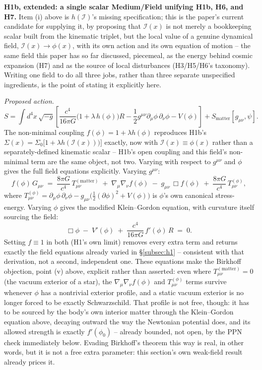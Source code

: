 \documentclass[12pt, a4paper]{article}
\begin{document}
\textbf{H1b, extended: a single scalar Medium/Field unifying H1b, H6,
and H7.} Item (i) above is $h(\mathcal{I})$'s missing specification;
this is the paper's current candidate for supplying it, by proposing
that $\mathcal{I}(x)$ is not merely a bookkeeping scalar built from
the kinematic triplet, but the local value of a genuine dynamical
field, $\mathcal{I}(x)\to\phi(x)$, with its own action and its own
equation of motion -- the same field this paper has so far discussed,
piecemeal, as the energy behind cosmic expansion (H7) and as the
source of local disturbances (H3/H5/H6's taxonomy). Writing one field
to do all three jobs, rather than three separate unspecified
ingredients, is the point of stating it explicitly here.

\emph{Proposed action.}
\begin{equation}
S = \int d^4x\,\sqrt{-g}\left[\frac{c^4}{16\pi G}\big(1+\lambda\,h(\phi)\big)R
    -\frac12 g^{\mu\nu}\partial_\mu\phi\,\partial_\nu\phi - V(\phi)\right]
    + S_{\text{matter}}[g_{\mu\nu},\psi].
\end{equation}
The non-minimal coupling $f(\phi)=1+\lambda h(\phi)$ reproduces H1b's
$\Sigma(x)=\Sigma_0\big[1+\lambda h(\mathcal{I}(x))\big)]$ exactly, now
with $\mathcal{I}(x)\equiv\phi(x)$ rather than a separately-defined
kinematic scalar -- H1b's open coupling and this field's non-minimal
term are the same object, not two. Varying with respect to $g^{\mu\nu}$
and $\phi$ gives the full field equations explicitly. Varying
$g^{\mu\nu}$:
\begin{equation}
f(\phi)\,G_{\mu\nu} \;=\; \frac{8\pi G}{c^4}\,T_{\mu\nu}^{(\text{matter})}
\;+\; \nabla_\mu\nabla_\nu f(\phi) \;-\; g_{\mu\nu}\,\Box f(\phi)
\;+\; \frac{8\pi G}{c^4}\,T_{\mu\nu}^{(\phi)},
\end{equation}
where $T_{\mu\nu}^{(\phi)} = \partial_\mu\phi\,\partial_\nu\phi -
g_{\mu\nu}\big(\tfrac12(\partial\phi)^2+V(\phi)\big)$ is $\phi$'s own
canonical stress-energy. Varying $\phi$ gives the modified
Klein--Gordon equation, with curvature itself sourcing the field:
\begin{equation}
\Box\phi \;-\; V'(\phi) \;+\; \frac{c^4}{16\pi G}\,f'(\phi)\,R \;=\; 0.
\end{equation}
Setting $f\equiv1$ in both (H1's own limit) removes every extra term
and returns exactly the field equations already varied in
\S\ref{subsec:h1} -- consistent with that derivation, not a second,
independent one. These equations make the Birkhoff objection, point
(v) above, explicit rather than asserted: even where
$T_{\mu\nu}^{(\text{matter})}=0$ (the vacuum exterior of a star), the
$\nabla_\mu\nabla_\nu f(\phi)$ and $T_{\mu\nu}^{(\phi)}$ terms survive
whenever $\phi$ has a nontrivial exterior profile, and a static
vacuum exterior is no longer forced to be exactly Schwarzschild. That
profile is not free, though: it has to be sourced by the body's own
interior matter through the Klein--Gordon equation above, decaying
outward the way the Newtonian potential does, and its allowed
strength is exactly $f'(\phi_0)$ -- already bounded, not open, by the
PPN check immediately below. Evading Birkhoff's theorem this way is
real, in other words, but it is not a free extra parameter: this
section's own weak-field result already prices it.
\end{document}
